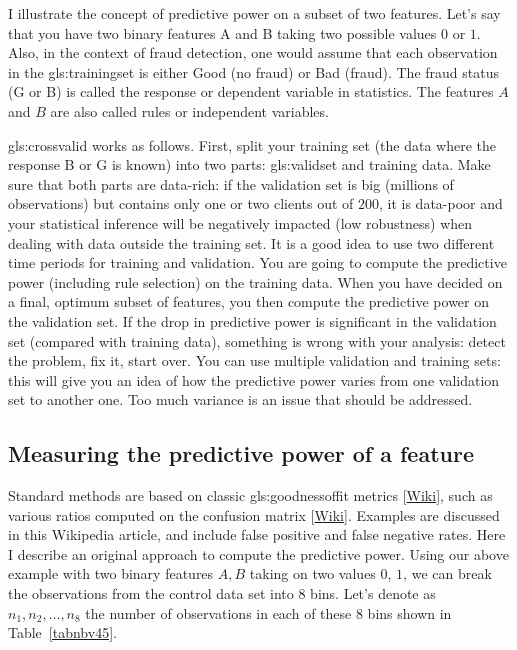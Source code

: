 \documentclass[oneside,10pt]{book}
\begin{document}
I illustrate the concept of predictive power on a subset of two features. Let’s say that you have two binary features A and B taking two possible values $0$ or $1$. Also, in the context of fraud detection, one would assume that each observation in the \gls{gls:trainingset} is either Good (no fraud) or Bad (fraud). The fraud status (G or B) is called the response or dependent variable in statistics. The features $A$ and $B$ are also called rules or independent variables.

\Gls{gls:crossvalid} works as follows. First, split your \textcolor{index}{training set} (the data where the response B or G is known) into two parts:
\gls{gls:validset} and training data. Make sure that both parts are data-rich: if the validation set is big (millions of observations) but contains only one or two clients out of $200$, it is data-poor and your statistical inference will be negatively impacted (low robustness) when dealing with data outside the training set. It is a good idea to use two different time periods for training and validation. You are going to compute the predictive power (including rule selection) on the training data. When you have decided on a final, optimum subset of features, you then compute the predictive power on the validation set. If the drop in predictive power is significant in the validation set (compared with training data), something is wrong with your analysis: detect the problem, fix it, start over. You can use multiple validation and training sets: this will give you an idea of how the predictive power varies from one validation set to another one. Too much variance is an issue that should be addressed.

\subsection{Measuring the predictive power of a feature}\label{secdr}

Standard methods are based on classic  \gls{gls:goodnessoffit} metrics [\href{https://en.wikipedia.org/wiki/Goodness_of_fit}{Wiki}], such as various ratios computed on the \textcolor{index}{confusion matrix}
[\href{https://en.wikipedia.org/wiki/Confusion_matrix}{Wiki}]. Examples are discussed in this Wikipedia article, and include false positive and false negative rates.
Here I describe an original approach to compute the \textcolor{index}{predictive power}. Using our above example with two binary features $A, B$ taking on two values $0$, $1$, we can break the observations from the control data set into $8$ bins.  Let's denote as $n_1, n_2,\dots,n_8$ the number of observations in each of these $8$ bins
shown in Table~\ref{tabnbv45}.
\end{document}
